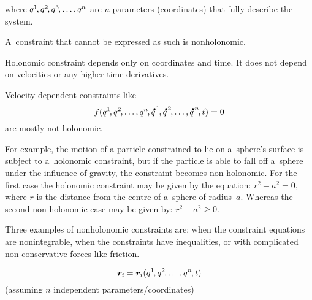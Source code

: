 \noindent
where ${q^{1} \hspace{-0.25ex}, q^{2} \hspace{-0.25ex}, q^{3} \hspace{-0.25ex}, \ldots, q^{n}}$ are $n$ parameters (coordinates) that fully describe the system.

A~constraint that cannot be expressed as such is nonholonomic.

Holonomic constraint depends only on coordinates and time.
It does not depend on velocities or any higher time derivatives.

Velocity-dependent constraints like
\[
f(q^{1} \hspace{-0.25ex}, q^{2} \hspace{-0.25ex}, \ldots, q^{n} \hspace{-0.25ex}, {\mathdotabove{q}}^{\hspace{.2ex}1} \hspace{-0.25ex}, {\mathdotabove{q}}^{\hspace{.2ex}2} \hspace{-0.25ex}, \ldots, {\mathdotabove{q}}^{\hspace{.2ex}n} \hspace{-0.25ex}, t) = 0
\]
are mostly not holonomic.

For example, the motion of a particle constrained to lie on a~sphere’s surface is subject to a~holonomic constraint, but if the particle is able to fall off a~sphere under the influence of gravity, the constraint becomes non-holonomic.
For the first case the holonomic constraint may be given by the equation: ${r^{2} - a^{2} = 0}$, where $r$ is the distance from the centre of a~sphere of radius~$a$.
Whereas the second non-holonomic case may be given by: ${r^{2} - a^{2} \geq 0}$.

Three examples of nonholonomic constraints are: when the constraint equations are nonintegrable, when the constraints have inequalities, or with complicated non-conservative forces like friction.

\[
\bm{r}_{i} \hspace{-0.1ex} = \bm{r}_{i}(q^{1} \hspace{-0.25ex}, q^{2} \hspace{-0.25ex}, \ldots, q^{n} \hspace{-0.25ex}, t)
\]
(assuming $n$ independent parameters/coordinates)


